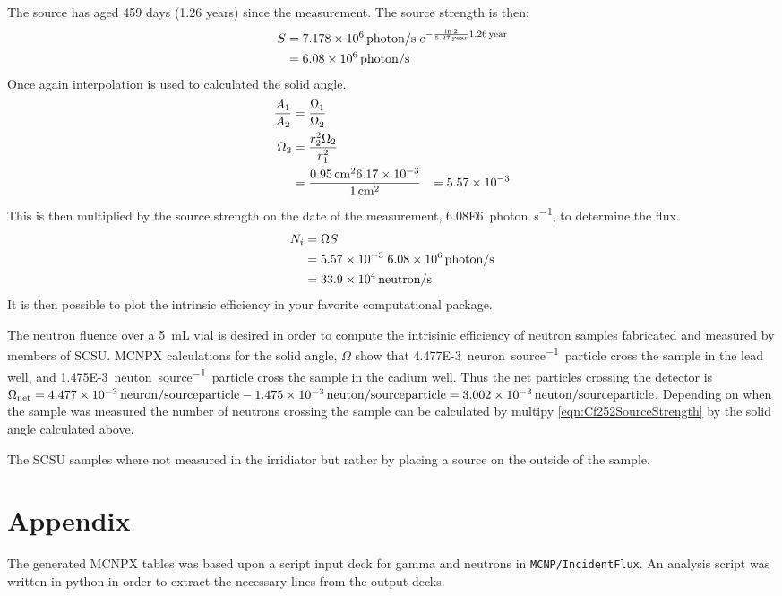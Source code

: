 \documentclass[draftcls,onecolumn]{IEEEtran}
\begin{document}
\begin{Exercise*}[label={LiBorateGlass},title={Li borate glass},name={Example}]
The  source has aged 459 days (1.26 years) since the measurement.
The source strength is then:
\begin{align}
  S &= \SI{7.178E6}{photon\per\second}\;e^{-\frac{ \ln{2}}{\SI{5.27}{year}}\SI{1.26}{year}} \\ \notag
    &= \SI{6.08E6}{photon\per\second}
\end{align}
Once again interpolation is used to calculated the solid angle.
\begin{align*}
	\frac{A_1}{A_2} &= \frac{\Omega_1}{\Omega_2} \\ \notag
	\Omega_2 &= \frac{r_2^2 \Omega_2}{r_1^2} \\
	 &= \frac{\SI{0.95}{\cm}^2 \num{6.17E-3}}{\SI{1}{\cm}^2}
	 &= \num{5.57E-3}
\end{align*}
This is then multiplied by the source strength on the date of the measurement, \SI{6.08E6}{photon\per\second}, to determine the flux.
\begin{align*}
 	N_i &= \Omega S \\
	 &= \num{5.57E-3} \; \SI{6.08E6}{photon\per\second} \\
      &= \SI{33.9E4}{neutron\per\second}
\end{align*}
It is then possible to plot the intrinsic efficiency in your favorite computational package.

\end{Exercise*}
\begin{Exercise*}[label={LiquidSample},title={Liquid Sample},name={Example}]
The neutron fluence over a \SI{5}{\milli\liter} vial is desired in order to compute the intrisinic efficiency of neutron samples fabricated and measured by members of SCSU.
MCNPX calculations for the solid angle, $\Omega$ show that \SI{4.477E-3}{neuron\per source particle} cross the sample in the lead well, and \SI{1.475E-3}{neuton\per source particle} cross the sample in the cadium well.
Thus the net particles crossing the detector is $\Omega_{\text{net}} =\SI{4.477E-3}{neuron\per source particle} - \SI{1.475E-3}{neuton\per source particle} =\SI{3.002E-3}{neuton\per source particle} $.
Depending on when the sample was measured the number of neutrons crossing the sample can be calculated by multipy \eqref{eqn:Cf252SourceStrength} by the solid angle calculated above.

The SCSU samples where not measured in the  irridiator but rather by placing a source on the outside of the sample.

\end{Exercise*}



\section{Appendix}
The generated MCNPX tables was based upon a script input deck for gamma and neutrons in \verb+MCNP/IncidentFlux+.
An analysis script was written in python in order to extract the necessary lines from the output decks.
\end{document}
